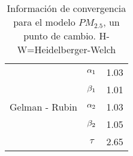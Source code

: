 \begin{table}[!h]
\begin{tabular}{|l|c|l|l|l|l|l|}
\multirow{5}{2.5cm}{Gelman - Rubin} & $\alpha_1$ & \multicolumn{5}{|c|}{1.03}\\ \cline{2-7}
&$\beta_1$ &  \multicolumn{5}{|c|}{1.01} \\ \cline{2-7}
&$\alpha_2$ &  \multicolumn{5}{|c|}{1.03} \\ \cline{2-7}
&$\beta_2$ &  \multicolumn{5}{|c|}{1.05} \\ \cline{2-7}
&$\tau$ &  \multicolumn{5}{|c|}{2.65} \\ \cline{1-7}



\end{tabular}
\caption{Información de convergencia para el modelo $PM_{2.5}$, un punto de cambio. H-W=Heidelberger-Welch}
\label{convergencia_updc_pm25}
\end{table}



